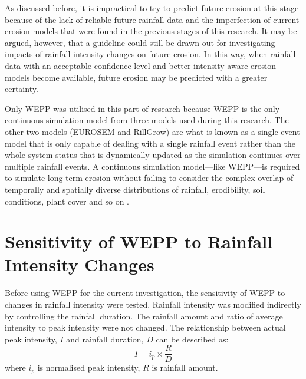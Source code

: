 As discussed before, it is impractical to try to predict future erosion at this
stage because of the lack of reliable future rainfall data and the imperfection
of current erosion models that were found in the previous stages of this
research. It may be argued, however, that a guideline could still be drawn out
for investigating impacts of rainfall intensity changes on future erosion. In
this way, when rainfall data with an acceptable confidence level and better
intensity-aware erosion models become available, future erosion may be predicted
with a greater certainty.

Only WEPP was utilised in this part of research because WEPP is the only
continuous simulation model from three models used during this research. The
other two models (EUROSEM and RillGrow) are what is known as a single event
model that is only capable of dealing with a single rainfall event rather than
the whole system status that is dynamically updated as the simulation continues
over multiple rainfall events. A continuous simulation model---like WEPP---is
required to simulate long-term erosion without failing to consider the complex
overlap of temporally and spatially diverse distributions of rainfall,
erodibility, soil conditions, plant cover and so on \citep{nearing2006-145}.






\section{Sensitivity of WEPP to Rainfall Intensity Changes}
\label{sec:MethodsSensitivityOfCLIGENToRainfallIntensityChanges}

Before using WEPP for the current investigation, the sensitivity of WEPP to
changes in rainfall intensity were tested. Rainfall intensity was modified
indirectly by controlling the rainfall duration. The rainfall amount and ratio
of average intensity to peak intensity were not changed. The relationship
between actual peak intensity, $I$ and rainfall duration, $D$ can be described
as:
\begin{equation}
\label{eq:ActualIntensity}
  I = i_p \times \frac{R}{D}
\end{equation}
where $i_p$ is normalised peak intensity, $R$ is rainfall amount.

